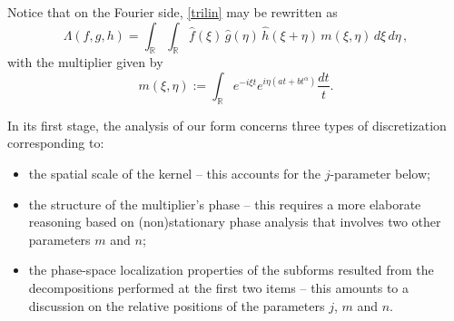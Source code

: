 \documentclass[a4paper,reqno]{amsart}
\numberwithin{equation}{section}
\theoremstyle{definition}
\newcommand{\R}{\mathbb{R}}
\def\a{\alpha}
\def\L{\Lambda}
\begin{document}
Notice that on the Fourier side, \eqref{trilin} may be rewritten as
\begin{equation}\label{multform}
	\L(f,g,h)=\int_\R\int_\R \hat{f}(\xi)\,\hat{g}(\eta)\,\hat{h}(\xi+\eta)\,m(\xi,\eta)\,d\xi \,d\eta\,,
\end{equation}
with the multiplier given by
\begin{equation}\label{mult}
	m(\xi,\eta):=\int_\R e^{-i\xi t}e^{i\eta (at+bt^\a)}\frac{dt}{t}.
\end{equation}

In its first stage, the analysis of our form concerns three types of discretization corresponding to:
\begin{itemize}
\item the spatial scale of the kernel -- this accounts for the $j$-parameter below;
\item the structure of the multiplier's phase -- this requires a more elaborate reasoning based on (non)stationary phase analysis that involves two other parameters $m$ and $n$;
\item the phase-space localization properties of the subforms resulted from the decompositions performed at the first two items -- this amounts to a discussion on the relative positions of the parameters $j$, $m$ and $n$.
\end{itemize}
\end{document}
